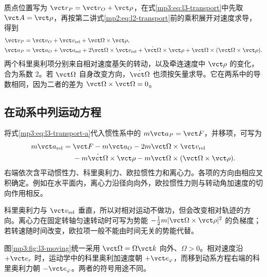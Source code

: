 \documentclass[11pt,openany,fontset=fandol]{ctexbook}
\theoremstyle{definition}\newtheorem{example}{例}[chapter]\newtheorem{exercise}{习题}[chapter]
\begin{document}
质点位置写为 $\vct r_P=\vct r_O+\vct\rho$，在式\eqref{mp3:eq:l3-transport}中先取 $\vct A=\vct\rho$，再按第二讲式\eqref{mp2:eq:l2-transport}前的乘积展开对速度求导，得到
\begin{align}
\vct v_P&=\vct v_O+\vct v_{\rm rel}+\vct\Omega\times\vct\rho,\label{mp3:eq:l3-transport-v}\\
\vct a_P&=\vct a_O+\vct a_{\rm rel}
+2\vct\Omega\times\vct v_{\rm rel}
+\dot{\vct\Omega}\times\vct\rho
+\vct\Omega\times(\vct\Omega\times\vct\rho).\label{mp3:eq:l3-transport-a}
\end{align}
两个科里奥利项分别来自相对速度基矢的转动，以及牵连速度中 $\vct\rho$ 的变化，合为系数 $2$。若 $\vct\Omega$ 自身改变方向，$\dot{\vct\Omega}$ 也须按矢量求导。它在两系中的导数相同，因为二者的差为 $\vct\Omega\times\vct\Omega=0$。

\subsection{在动系中列运动方程}
将式\eqref{mp3:eq:l3-transport-a}代入惯性系中的 $m\vct a_P=\vct F$，并移项，可写为
\begin{align}
m\vct a_{\rm rel}={}&\vct F-m\vct a_O
-2m\vct\Omega\times\vct v_{\rm rel}\nonumber\\
&-m\dot{\vct\Omega}\times\vct\rho
-m\vct\Omega\times(\vct\Omega\times\vct\rho).\label{mp3:eq:l3-moving-newton}
\end{align}
右端依次含平动惯性力、科里奥利力、欧拉惯性力和离心力。各项的方向由相应叉积确定。例如在水平面内，离心力沿径向向外，欧拉惯性力则与转动角加速度的切向作用相反。

科里奥利力与 $\vct v_{\rm rel}$ 垂直，所以对相对运动不做功，但会改变相对轨迹的方向。离心力在固定转轴匀速转动时可写为势能 $-\tfrac12m|\vct\Omega\times\vct\rho|^2$ 的负梯度；若转速随时间改变，欧拉项一般不能由时间无关的势能代替。

图\ref{mp3:fig:l3-moving}统一采用 $\vct\Omega=\Omega\vct k$ 向外、$\Omega>0$。相对速度沿 $+\vct e_r$ 时，运动学中的科里奥利加速度朝 $+\vct e_\varphi$，而移到动系方程右端的科里奥利力朝 $-\vct e_\varphi$。两者的符号用途不同。
\end{document}
